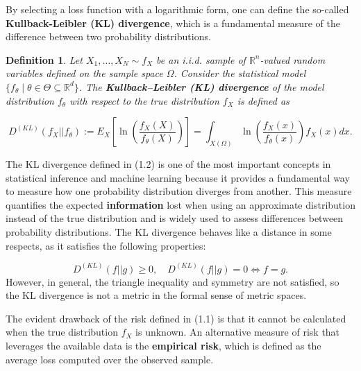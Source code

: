 \documentclass{report}
\newtheorem{definition}{Definition}[chapter]
\begin{document}
By selecting a loss function with a logarithmic form, one can define the so-called \textbf{Kullback-Leibler (KL) divergence}, which is a fundamental measure of the difference between two probability distributions.

\begin{definition}
Let $X_1,\dots,X_N \sim f_X$ be an i.i.d. sample of $\mathbb{R}^n$-valued random variables defined on the sample space $\Omega$. Consider the statistical model $\{f_\theta \mid\theta\in\Theta\subseteq\mathbb{R}^d\}$. The \textbf{Kullback–Leibler (KL) divergence} of the model distribution $f_\theta$ with respect to the true distribution $f_X$ is defined as

\begin{equation}
D^{(KL)}(f_X||f_\theta) := E_X \left[\ln\left(\frac{f_X(X)}{f_\theta(X)}\right)\right] = \int_{X(\Omega)} \ln \left( \frac{f_X(x)}{f_\theta(x)}  \right)f_X(x)dx.
\end{equation}
\end{definition}
The KL divergence defined in (1.2) is one of the most important concepts in statistical inference and machine learning because it provides a fundamental way to measure how one probability distribution diverges from another. This measure quantifies the expected \textbf{information} lost when using an approximate distribution instead of the true distribution and is widely used to assess differences between probability distributions. The KL divergence behaves like a distance in some respects, as it satisfies the following properties:

\begin{equation}
D^{(KL)}(f||g) \geq 0, \quad D^{(KL)}(f||g) = 0 \iff f = g.
\end{equation}
However, in general, the triangle inequality and symmetry are not satisfied, so the KL divergence is not a metric in the formal sense of metric spaces.

The evident drawback of the risk defined in (1.1) is that it cannot be calculated when the true distribution $f_X$ is unknown. An alternative measure of risk that leverages the available data is the \textbf{empirical risk}, which is defined as the average loss computed over the observed sample.
\end{document}
